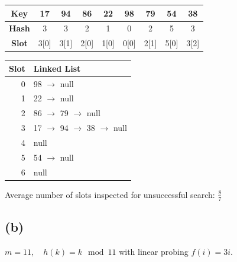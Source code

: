 \documentclass{article}
\begin{document}
\begin{center}
    \begin{tabular}{|c|c|c|c|c|c|c|c|c|}
        \hline
        \textbf{Key}  & 17   & 94   & 86   & 22   & 98   & 79   & 54   & 38   \\
        \hline
        \textbf{Hash} & 3    & 3    & 2    & 1    & 0    & 2    & 5    & 3    \\
        \hline
        \textbf{Slot} & 3[0] & 3[1] & 2[0] & 1[0] & 0[0] & 2[1] & 5[0] & 3[2] \\
        \hline
    \end{tabular}
    \begin{tabular}{|r|l|}
        \hline
        \textbf{Slot} & \textbf{Linked List} \\
        \hline
        0 & 98 $\to$ null \\
        1 & 22 $\to$ null \\
        2 & 86 $\to$ 79 $\to$ null \\
        3 & 17 $\to$ 94 $\to$ 38 $\to$ null \\
        4 & null \\
        5 & 54 $\to$ null \\
        6 & null \\
        \hline
    \end{tabular}
\end{center}

Average number of slots inspected for unsuccessful search: $\frac{8}{7}$

\subsection*{(b)}

$m = 11,\quad h(k) = k \mod 11$ with linear probing $f(i) = 3i$.
\end{document}
